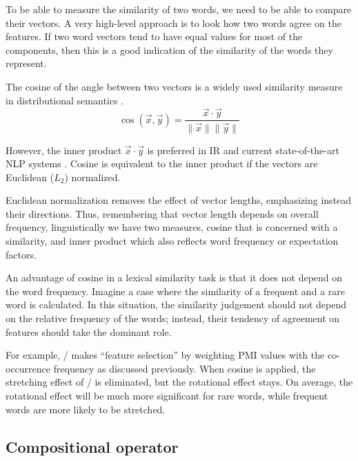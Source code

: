 To be able to measure the similarity of two words, we need to be able to compare their vectors. A very high-level approach is to look how two words agree on the features. If two word vectors tend to have equal values for most of the components, then this is a good indication of the similarity of the words they represent.

The cosine of the angle between two vectors is a widely used similarity measure in distributional semantics \cite{Turney:2010:FMV:1861751.1861756,lapesa2014large}.
%
\begin{equation*}
  \label{eq:cos}
  \cos(\vec{x}, \vec{y}) = \frac{\vec{x} \cdot \vec{y}}
                                {\|\vec{x}\| \|\vec{y}\|}
\end{equation*}

However, the inner product $\vec{x} \cdot \vec{y}$ is preferred in IR and current state-of-the-art NLP systems \cite{mikolov2013distributed,mikolov2013linguistic,TACL570}. Cosine is equivalent to the inner product if the vectors are Euclidean ($L_2$) normalized.

Euclidean normalization removes the effect of vector lengths, emphasizing instead their directions. Thus, remembering that vector length depends on overall frequency, linguistically we have two measures, cosine that is concerned with a similarity, and inner product which also reflects word frequency or expectation factors.

An advantage of cosine in a lexical similarity task is that it does not depend on the word frequency. Imagine a case where the similarity of a frequent and a rare word is calculated. In this situation, the similarity judgement should not depend on the relative frequency of the words; instead, their tendency of agreement on features should take the dominant role.

For example, \NPMI/ makes ``feature selection'' by weighting PMI values with the co-occurrence frequency as discussed previously. When cosine is applied, the stretching effect of \NPMI/ is eliminated, but the rotational effect stays. On average, the rotational effect will be much more significant for rare words, while frequent words are more likely to be stretched.


\subsection{Compositional operator}
\label{sec:comp-oper}

